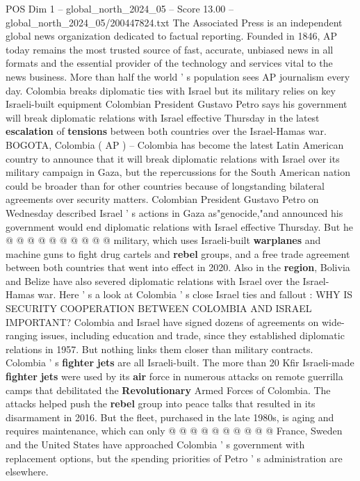 \begin{textsample}{POS Dim 1 – global\_north\_2024\_05 – Score 13.00 – global\_north\_2024\_05/200447824.txt}  \label{ex:f1_pos_408}
The Associated Press is an independent global news organization dedicated to factual reporting.
Founded in 1846, AP today remains the most trusted source of fast, accurate, unbiased news in all formats and the essential provider of the technology and services vital to the news business.
More than half the world ' s population sees AP journalism every day.
Colombia breaks diplomatic ties with Israel but its military relies on key Israeli-built equipment Colombian President Gustavo Petro says his government will break diplomatic relations with Israel effective Thursday in the latest \textbf{escalation} of \textbf{tensions} between both countries over the Israel-Hamas war.
BOGOTA, Colombia ( AP ) -- Colombia has become the latest Latin American country to announce that it will break diplomatic relations with Israel over its military campaign in Gaza, but the repercussions for the South American nation could be broader than for other countries because of longstanding bilateral agreements over security matters.
Colombian President Gustavo Petro on Wednesday described Israel ' s actions in Gaza as"genocide,"and announced his government would end diplomatic relations with Israel effective Thursday.
But he @ @ @ @ @ @ @ @ @ @ military, which uses Israeli-built \textbf{warplanes} and machine guns to fight drug cartels and \textbf{rebel} groups, and a free trade agreement between both countries that went into effect in 2020.
Also in the \textbf{region}, Bolivia and Belize have also severed diplomatic relations with Israel over the Israel-Hamas war.
Here ' s a look at Colombia ' s close Israel ties and fallout : WHY IS SECURITY COOPERATION BETWEEN COLOMBIA AND ISRAEL IMPORTANT?
Colombia and Israel have signed dozens of agreements on wide-ranging issues, including education and trade, since they established diplomatic relations in 1957.
But nothing links them closer than military contracts.
Colombia ' s \textbf{fighter} \textbf{jets} are all Israeli-built.
The more than 20 Kfir Israeli-made \textbf{fighter} \textbf{jets} were used by its \textbf{air} force in numerous attacks on remote guerrilla camps that debilitated the \textbf{Revolutionary} Armed Forces of Colombia.
The attacks helped push the \textbf{rebel} group into peace talks that resulted in its disarmament in 2016.
But the fleet, purchased in the late 1980s, is aging and requires maintenance, which can only @ @ @ @ @ @ @ @ @ @ France, Sweden and the United States have approached Colombia ' s government with replacement options, but the spending priorities of Petro ' s administration are elsewhere.

\end{textsample}
